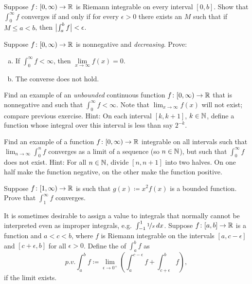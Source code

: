 \begin{exercise}
Suppose $f \colon [0,\infty) \to {\mathbb{R}}$ is Riemann integrable on every interval
$[0,b]$.  Show that  $\int_0^\infty f$ converges if and only if
for every $\epsilon > 0$ there exists an $M$ such that if $M \leq a < b$,
then $\bigl\lvert {\int_a^b f} \bigr\rvert < \epsilon$.
\end{exercise}

\begin{exercise}
Suppose $f \colon [0,\infty) \to {\mathbb{R}}$ is nonnegative and
\emph{decreasing}.  Prove:
\begin{enumerate}[a)]
\item
If $\int_0^\infty f < \infty$, then $\lim\limits_{x\to\infty} f(x) = 0$.
\item
The converse does not hold.
\end{enumerate}
\end{exercise}

\begin{exercise}
Find an example of an \emph{unbounded} continuous function $f \colon
[0,\infty) \to {\mathbb{R}}$ that is nonnegative and such that $\int_0^\infty f < \infty$.
Note that $\lim_{x\to\infty} f(x)$ will not exist; compare
previous exercise.
Hint: On each interval $[k,k+1]$, $k \in {\mathbb{N}}$, define a function whose
integral over this interval is less than say $2^{-k}$.
\end{exercise}

\begin{exercise}
Find an example of a function $f \colon [0,\infty) \to {\mathbb{R}}$ integrable on all
intervals such that $\lim_{n\to\infty} \int_0^n f$ converges as a
limit of a sequence (so $n \in {\mathbb{N}}$), but such that
$\int_0^\infty f$ does not exist.
Hint: For all $n\in {\mathbb{N}}$, divide $[n,n+1]$ into two halves.  On one half
make the function negative, on the other make the function positive.
\end{exercise}

\begin{exercise}
Suppose $f \colon [1,\infty) \to {\mathbb{R}}$ is such that
$g(x) \coloneqq x^2 f(x)$ is a bounded function. Prove that
$\int_1^\infty f$ converges.
\end{exercise}

\begin{exnote}
It is sometimes desirable to assign a value to integrals that normally
cannot be interpreted even as improper integrals,
e.g.\ $\int_{-1}^1 \nicefrac{1}{x}\,dx$.
Suppose $f \colon [a,b] \to {\mathbb{R}}$ is a function and $a < c < b$,
where $f$ is Riemann integrable on the intervals
$[a,c-\epsilon]$ and $[c+\epsilon,b]$ for all $\epsilon > 0$.
Define
the \emph{} of $\int_a^b f$ as
\begin{equation*}
p.v.\!\int_a^b f \coloneqq \lim_{\epsilon\to 0^+}
\left(
\int_a^{c-\epsilon} f + 
\int_{c+\epsilon}^b f
\right) ,
\end{equation*}
if the limit exists.
\end{exnote}

